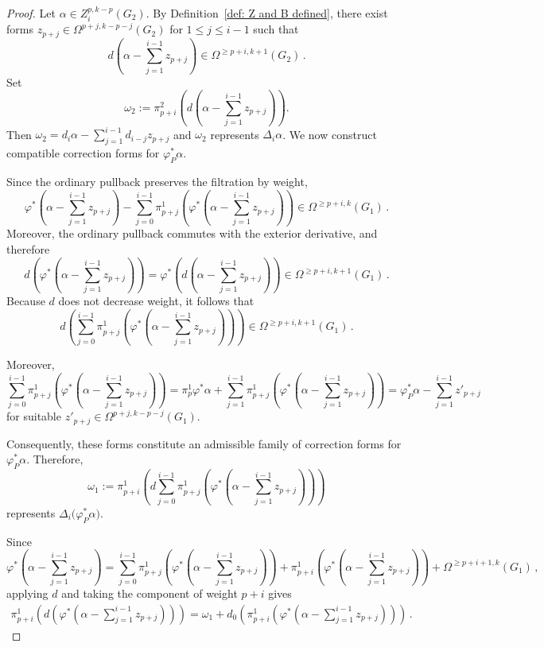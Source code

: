\documentclass[dvipsnames]{amsart}
\theoremstyle{definition}
\theoremstyle{definition}
\numberwithin{equation}{section}
\begin{document}
\begin{proof}


Let $\alpha\in Z_i^{p,k-p}(G_2)$.
By Definition~\ref{def: Z and B defined}, there exist forms $z_{p+j}\in\Omega^{p+j,k-p-j}(G_2)$ for $1\leq j\leq i-1$
such that
\[
d\left(\alpha-\sum_{j=1}^{i-1}z_{p+j}\right)
\in
\Omega^{\geq p+i,k+1}(G_2)\,.
\]
Set
\[
\omega_2
:=
\pi_{p+i}^2\left(d\left(\alpha-\sum_{j=1}^{i-1}z_{p+j}\right)\right).
\]
Then $\omega_2
=
d_i\alpha
-
\sum_{j=1}^{i-1}
d_{i-j}z_{p+j}$
and \(\omega_2\) represents \(\Delta_i\alpha\).
We now construct compatible correction forms for
\(\varphi_P^*\alpha\). 

Since the ordinary pullback preserves the filtration by weight,
\[
\varphi^*\left(\alpha-\sum_{j=1}^{i-1}z_{p+j}\right)-\sum_{j=0}^{i-1}
\pi_{p+j}^1\left(\varphi^*\left(\alpha-\sum_{j=1}^{i-1}z_{p+j}\right)\right)
\in
\Omega^{\geq p+i,k}(G_1)\,.
\]
Moreover, the ordinary pullback commutes with the exterior
derivative, and therefore
\[
d\left(\varphi^*\left(\alpha-\sum_{j=1}^{i-1}z_{p+j}\right)\right)
=
\varphi^*\left(d\left(\alpha-\sum_{j=1}^{i-1}z_{p+j}\right)\right)
\in
\Omega^{\geq p+i,k+1}(G_1)\,.
\]
Because \(d\) does not decrease weight, it follows that
\[
d\left(\sum_{j=0}^{i-1}
\pi_{p+j}^1\left(\varphi^*\left(\alpha-\sum_{j=1}^{i-1}z_{p+j}\right)\right)
\right)\in
\Omega^{\geq p+i,k+1}(G_1)\,.
\]

Moreover,
\[
\sum_{j=0}^{i-1}
\pi_{p+j}^1\left(\varphi^*\left(\alpha-\sum_{j=1}^{i-1}z_{p+j}\right)\right)
=\pi_p^1\varphi^\ast\alpha+\sum_{j=1}^{i-1}
\pi_{p+j}^1\left(\varphi^*\left(\alpha-\sum_{j=1}^{i-1}z_{p+j}\right)\right)=
\varphi_P^*\alpha
-
\sum_{j=1}^{i-1}z'_{p+j}
\]
for suitable $z'_{p+j}
\in
\Omega^{p+j,k-p-j}(G_1)$.

Consequently, these forms constitute an admissible family of
correction forms for \(\varphi_P^*\alpha\). Therefore,
\[
\omega_1
:=
\pi_{p+i}^1\left(d\sum_{j=0}^{i-1}
\pi_{p+j}^1\left(\varphi^*\left(\alpha-\sum_{j=1}^{i-1}z_{p+j}\right)\right)\right)
\]
represents $\Delta_i\bigl(\varphi_P^*\alpha\bigr)$.

Since
\[
\varphi^*\left(\alpha-\sum_{j=1}^{i-1}z_{p+j}\right)
=
\sum_{j=0}^{i-1}
\pi_{p+j}^1\left(\varphi^*\left(\alpha-\sum_{j=1}^{i-1}z_{p+j}\right)\right)+
\pi_{p+i}^1\left(\varphi^*\left(\alpha-\sum_{j=1}^{i-1}z_{p+j}\right)\right)+\Omega^{\geq p+i+1,k}(G_1)\,,
\]
applying \(d\) and taking the component of weight \(p+i\)
gives
\begin{align}
\label{eq:weight-pi-pullback-u}
\pi_{p+i}^1\left(d\left(\varphi^*\left(\alpha-\sum_{j=1}^{i-1}z_{p+j}\right)\right)\right)=
\omega_1+d_0\left(\pi_{p+i}^1\left(\varphi^*\left(\alpha-\sum_{j=1}^{i-1}z_{p+j}\right)\right)\right)\,.
\end{align}


\end{proof}
\end{document}
